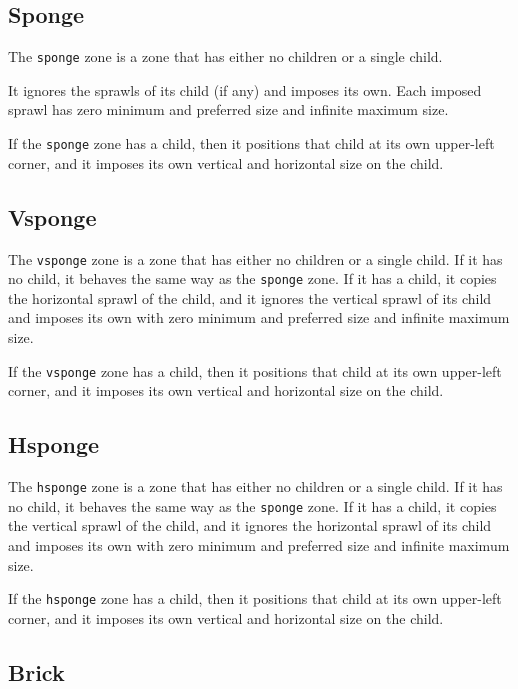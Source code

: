 \documentclass{report}
\def\code#1{\texttt{#1}}
\begin{document}
\subsection{Sponge}
\label{sec-zones-layout-sponge}

The \code{sponge} zone is a zone that has either no children or a
single child.  

It ignores the sprawls of its child (if any) and imposes its own.
Each imposed sprawl has zero minimum and preferred size and infinite
maximum size.

If the \code{sponge} zone has a child, then it positions that child at
its own upper-left corner, and it imposes its own vertical and
horizontal size on the child.

\subsection{Vsponge}
\label{sec-zones-layout-vsponge}

The \code{vsponge} zone is a zone that has either no children or a
single child.  If it has no child, it behaves the same way as the
\code{sponge} zone.   If it has a
child, it copies the horizontal sprawl of the child, and it ignores
the vertical sprawl of its child and imposes its own with zero minimum
and preferred size and infinite maximum size.

If the \code{vsponge} zone has a child, then it positions that child
at its own upper-left corner, and it imposes its own vertical and
horizontal size on the child.

\subsection{Hsponge}
\label{sec-zones-layout-hsponge}

The \code{hsponge} zone is a zone that has either no children or a single
child.  If it has no child, it behaves the same way as the
\code{sponge} zone.   If it has a
child, it copies the vertical sprawl of the child, and it ignores
the horizontal sprawl of its child and imposes its own with zero minimum
and preferred size and infinite maximum size.

If the \code{hsponge} zone has a child, then it positions that child
at its own upper-left corner, and it imposes its own vertical and
horizontal size on the child.

\subsection{Brick}
\label{sec-zones-layout-brick}
\end{document}
